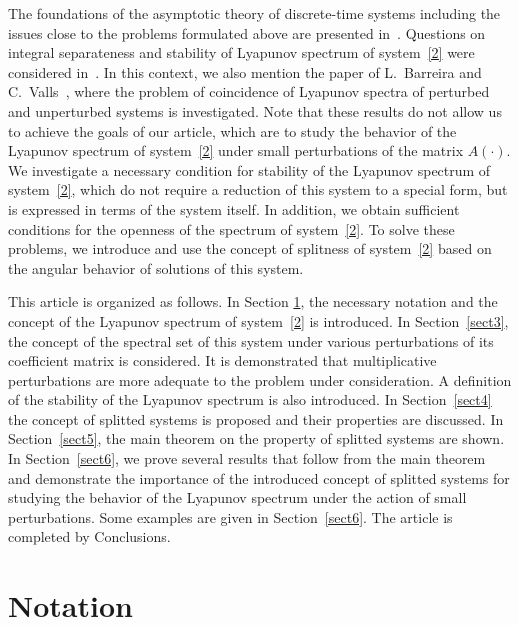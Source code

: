 \documentclass[11pt]{article}
\begin{document}
The foundations of the asymptotic theory of discrete-time systems 
including the issues close to the problems formulated above
are presented in~\cite{Czornik,Elaydi,GAI}. 
Questions on integral separateness  and stability of Lyapunov spectrum of system~\eqref{2} 
were considered in~\cite{Ban,BP,IR}. In this context,  
we also mention the paper of L.~Barreira and C.~Valls~\cite{Barreira2}, where the problem of coincidence
of Lyapunov spectra of perturbed and unperturbed systems is investigated.
Note that these results do not allow us to achieve the goals of our article, which are to study the behavior
of the Lyapunov spectrum of system~\eqref{2} under small perturbations of the matrix $A(\cdot)$. 
We investigate a necessary condition for
stability of the Lyapunov spectrum of system~\eqref{2}, which do not require
a reduction of this system to a special form, but is expressed in terms of the system itself.
In addition, we obtain sufficient conditions for the openness of the spectrum of system~\eqref{2}. 
To solve these problems, we introduce and use the concept of splitness of system~\eqref{2} based on 
the angular behavior of solutions of this system. 

This article is organized as follows. In Section \ref{sect2}, the necessary notation
and the concept of the Lyapunov spectrum of system~\eqref{2} 
is introduced.
In Section~\ref{sect3}, the concept of the spectral set of this system under various
perturbations of its coefficient matrix is considered.
It is demonstrated that
multiplicative perturbations are more adequate to the problem under consideration.
A definition
of the stability of the Lyapunov spectrum is also introduced. In Section~\ref{sect4}
the concept of splitted systems is proposed and their properties are
discussed. In Section~\ref{sect5}, the main theorem on the property of 
 splitted systems are shown.
In Section~\ref{sect6}, we prove several results that follow from 
the main theorem
and demonstrate the importance of the introduced 
concept of splitted systems for studying the behavior of the Lyapunov spectrum  under the action of 
small perturbations. 
Some examples are given in Section~\ref{sect6}. The article is completed by Conclusions.



\section{Notation}\label{sect2}
\end{document}
